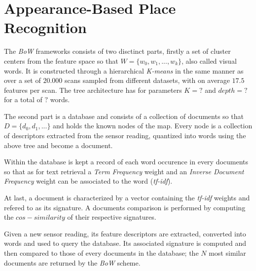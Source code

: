 \section{Appearance-Based Place Recognition}
\label{sec:chap2}

The \textit{BoW} frameworks consists of two disctinct parts, firstly a set of cluster centers from the feature space so that $W=\{w_0, w_1,..., w_k\}$, also called visual words. It is constructed through a hierarchical \textit{K-means} in the same manner as \cite{Nister06} over a set of $20.000$ scans sampled from different datasets, with on average $17.5$ features per scan. The tree architecture has for parameters $K=?$ and $depth=?$ for a total of $?$ words.

The second part is a database and consists of a collection of documents so that $D=\{d_0, d_1,...\}$ and holds the known nodes of the map. Every node is a collection of descriptors extracted from the sensor reading, quantized into words using the above tree and become a document.

Within the database is kept a record of each word occurence in every documents so that as for text retrieval a \textit{Term Frequency} weight and an \textit{Inverse Document Frequency} weight can be associated to the word (\textit{tf-idf}).

At last, a document is characterized by a vector containing the \textit{tf-idf} weights and refered to as its signature. A documents comparison is performed by computing the $cos-similarity$ of their respective signatures.

Given a new sensor reading, its feature descriptors are extracted, converted into words and used to query the database. Its associated signature is computed and then compared to those of every documents in the database; the $N$ most similar documents are returned by the \textit{BoW} scheme.